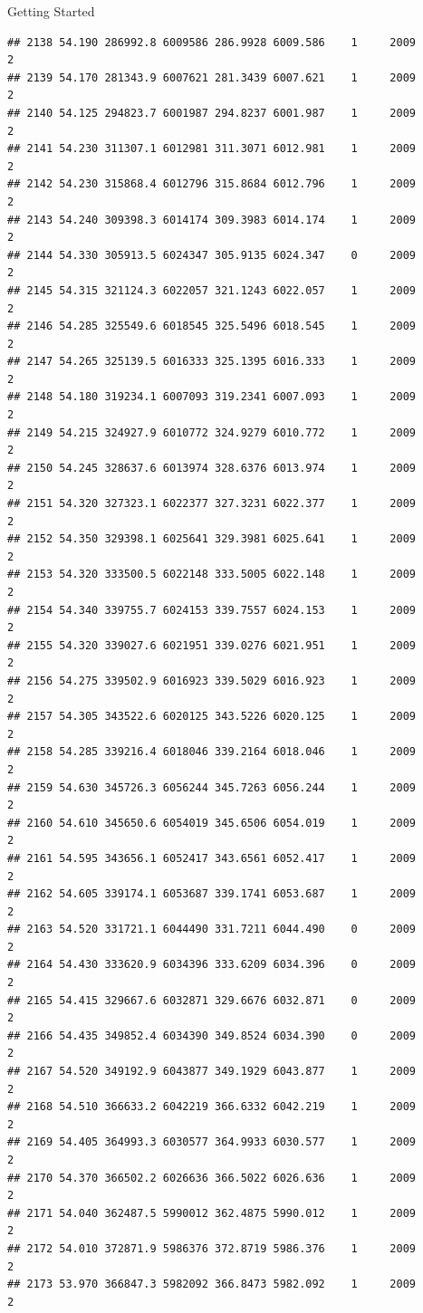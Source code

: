 \documentclass[
  ignorenonframetext,
]{beamer}
\begin{document}
\begin{frame}[fragile]{Getting Started}
\begin{verbatim}
## 2138 54.190 286992.8 6009586 286.9928 6009.586    1     2009        2
## 2139 54.170 281343.9 6007621 281.3439 6007.621    1     2009        2
## 2140 54.125 294823.7 6001987 294.8237 6001.987    1     2009        2
## 2141 54.230 311307.1 6012981 311.3071 6012.981    1     2009        2
## 2142 54.230 315868.4 6012796 315.8684 6012.796    1     2009        2
## 2143 54.240 309398.3 6014174 309.3983 6014.174    1     2009        2
## 2144 54.330 305913.5 6024347 305.9135 6024.347    0     2009        2
## 2145 54.315 321124.3 6022057 321.1243 6022.057    1     2009        2
## 2146 54.285 325549.6 6018545 325.5496 6018.545    1     2009        2
## 2147 54.265 325139.5 6016333 325.1395 6016.333    1     2009        2
## 2148 54.180 319234.1 6007093 319.2341 6007.093    1     2009        2
## 2149 54.215 324927.9 6010772 324.9279 6010.772    1     2009        2
## 2150 54.245 328637.6 6013974 328.6376 6013.974    1     2009        2
## 2151 54.320 327323.1 6022377 327.3231 6022.377    1     2009        2
## 2152 54.350 329398.1 6025641 329.3981 6025.641    1     2009        2
## 2153 54.320 333500.5 6022148 333.5005 6022.148    1     2009        2
## 2154 54.340 339755.7 6024153 339.7557 6024.153    1     2009        2
## 2155 54.320 339027.6 6021951 339.0276 6021.951    1     2009        2
## 2156 54.275 339502.9 6016923 339.5029 6016.923    1     2009        2
## 2157 54.305 343522.6 6020125 343.5226 6020.125    1     2009        2
## 2158 54.285 339216.4 6018046 339.2164 6018.046    1     2009        2
## 2159 54.630 345726.3 6056244 345.7263 6056.244    1     2009        2
## 2160 54.610 345650.6 6054019 345.6506 6054.019    1     2009        2
## 2161 54.595 343656.1 6052417 343.6561 6052.417    1     2009        2
## 2162 54.605 339174.1 6053687 339.1741 6053.687    1     2009        2
## 2163 54.520 331721.1 6044490 331.7211 6044.490    0     2009        2
## 2164 54.430 333620.9 6034396 333.6209 6034.396    0     2009        2
## 2165 54.415 329667.6 6032871 329.6676 6032.871    0     2009        2
## 2166 54.435 349852.4 6034390 349.8524 6034.390    0     2009        2
## 2167 54.520 349192.9 6043877 349.1929 6043.877    1     2009        2
## 2168 54.510 366633.2 6042219 366.6332 6042.219    1     2009        2
## 2169 54.405 364993.3 6030577 364.9933 6030.577    1     2009        2
## 2170 54.370 366502.2 6026636 366.5022 6026.636    1     2009        2
## 2171 54.040 362487.5 5990012 362.4875 5990.012    1     2009        2
## 2172 54.010 372871.9 5986376 372.8719 5986.376    1     2009        2
## 2173 53.970 366847.3 5982092 366.8473 5982.092    1     2009        2

\end{verbatim}
\end{frame}
\end{document}
